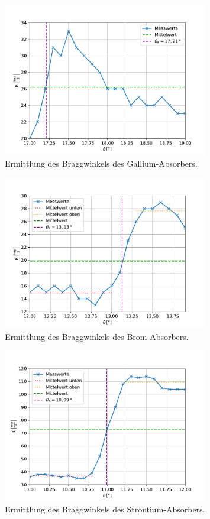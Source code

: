 \begin{figure}[H]
  \centering
  \includegraphics[width=0.80\textwidth]{content/Plots/Gallium.pdf}
  \caption{Ermittlung des Braggwinkels des Gallium-Absorbers.}
  \label{fig:Gallium}
\end{figure}
\begin{figure}[H]
  \centering
  \includegraphics[width=0.80\textwidth]{content/Plots/Brom.pdf}
  \caption{Ermittlung des Braggwinkels des Brom-Absorbers.}
  \label{fig:Brom}
\end{figure}
\begin{figure}[H]
  \centering
  \includegraphics[width=0.80\textwidth]{content/Plots/Strontium.pdf}
  \caption{Ermittlung des Braggwinkels des Strontium-Absorbers.}
  \label{fig:Strontium}
\end{figure}
